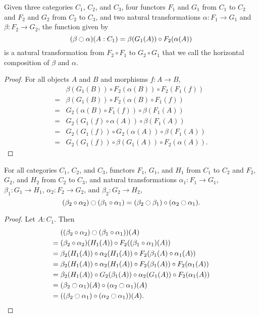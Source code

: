 \documentclass[../../math.tex]{subfiles}
\begin{document}
\begin{theorem}
    Given three categories $C_1$, $C_2$, and $C_3$, four functors $F_1$ and
    $G_1$ from $C_1$ to $C_2$ and $F_2$ and $G_2$ from $C_2$ to $C_3$, and two
    natural transformations $\alpha : F_1 \to G_1$ and $\beta : F_2 \to G_2$,
    the function given by \[
        (\beta \ocircle \alpha)(A : C_1) = \beta(G_1(A)) \circ F_2(\alpha(A))
    \]
    is a natural transformation from $F_2 \circ F_1$ to $G_2 \circ G_1$ that we
    call the horizontal composition of $\beta$ and $\alpha$.
\end{theorem}
\begin{proof}
    For all objects $A$ and $B$ and morphisms $f : A \to B$,
    \begin{align*}
         {}& \beta(G_1(B)) \circ F_2(\alpha(B)) \circ F_2(F_1(f)) \\
        ={}& \beta(G_1(B)) \circ F_2(\alpha(B) \circ F_1(f)) \\
        ={}& G_2(\alpha(B) \circ F_1(f)) \circ \beta(F_1(A)) \\
        ={}& G_2(G_1(f) \circ \alpha(A)) \circ \beta(F_1(A)) \\
        ={}& G_2(G_1(f)) \circ G_2(\alpha(A)) \circ \beta(F_1(A)) \\
        ={}& G_2(G_1(f)) \circ \beta(G_1(A)) \circ F_2(\alpha(A)).
    \end{align*}
\end{proof}

\begin{theorem} \label{nat_trans_interchange}
    For all categories $C_1$, $C_2$, and $C_3$, functors $F_1$, $G_1$, and $H_1$
    from $C_1$ to $C_2$ and $F_2$, $G_2$, and $H_2$ from $C_2$ to $C_3$, and
    natural transformations $\alpha_1 : F_1 \to G_1$, $\beta_1 : G_1 \to H_1$,
    $\alpha_2 : F_2 \to G_2$, and $\beta_2 : G_2 \to H_2$,
    \[
        (\beta_2 \circ \alpha_2) \ocircle (\beta_1 \circ \alpha_1) =
        (\beta_2 \ocircle \beta_1) \circ (\alpha_2 \ocircle \alpha_1).
    \]
\end{theorem}
\begin{proof}
    Let $A : C_1$.  Then
    \begin{align*}
         {}& ((\beta_2 \circ \alpha_2) \ocircle (\beta_1 \circ \alpha_1))(A) \\
        ={}& (\beta_2 \circ \alpha_2)(H_1(A))
            \circ F_2((\beta_1 \circ \alpha_1)(A)) \\
        ={}& \beta_2(H_1(A)) \circ \alpha_2(H_1(A))
            \circ F_2(\beta_1(A) \circ \alpha_1(A)) \\
        ={}& \beta_2(H_1(A)) \circ \alpha_2(H_1(A))
            \circ F_2(\beta_1(A)) \circ F_2(\alpha_1(A)) \\
        ={}& \beta_2(H_1(A)) \circ G_2(\beta_1(A))
            \circ \alpha_2(G_1(A)) \circ F_2(\alpha_1(A)) \\
        ={}& (\beta_2 \ocircle \alpha_1)(A)
            \circ (\alpha_2 \ocircle \alpha_1)(A) \\
        ={}& ((\beta_2 \ocircle \alpha_1)
            \circ (\alpha_2 \ocircle \alpha_1))(A).
    \end{align*}
\end{proof}
\end{document}

